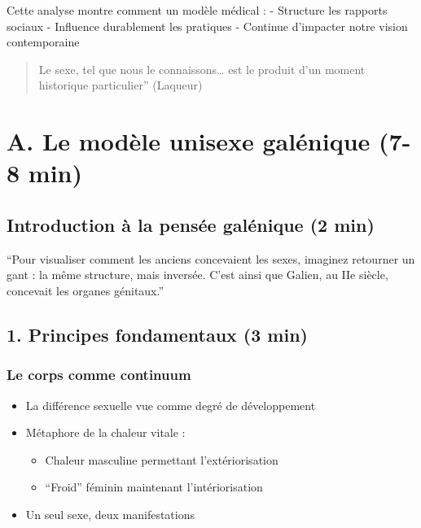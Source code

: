 \documentclass[
  letterpaper,
  DIV=11,
  numbers=noendperiod]{scrreprt}
\providecommand{\tightlist}{%
  \setlength{\itemsep}{0pt}\setlength{\parskip}{0pt}}\usepackage{longtable,booktabs,array}
\begin{document}
Cette analyse montre comment un modèle médical : - Structure les
rapports sociaux - Influence durablement les pratiques - Continue
d'impacter notre vision contemporaine

\begin{quote}
Le sexe, tel que nous le connaissons\ldots{} est le produit d'un moment
historique particulier'' (Laqueur)
\end{quote}

\subsection{}\label{section-5}


\chapter{A. Le modèle unisexe galénique (7-8
min)}\label{a.-le-moduxe8le-unisexe-galuxe9nique-7-8-min}

\section{Introduction à la pensée galénique (2
min)}\label{introduction-uxe0-la-pensuxe9e-galuxe9nique-2-min}

``Pour visualiser comment les anciens concevaient les sexes, imaginez
retourner un gant : la même structure, mais inversée. C'est ainsi que
Galien, au IIe siècle, concevait les organes génitaux.''

\section{1. Principes fondamentaux (3
min)}\label{principes-fondamentaux-3-min}

\subsection{Le corps comme continuum}\label{le-corps-comme-continuum}

\begin{itemize}
\tightlist
\item
  La différence sexuelle vue comme degré de développement
\item
  Métaphore de la chaleur vitale :

  \begin{itemize}
  \tightlist
  \item
    Chaleur masculine permettant l'extériorisation
  \item
    ``Froid'' féminin maintenant l'intériorisation
  \end{itemize}
\item
  Un seul sexe, deux manifestations
\end{itemize}
\end{document}
